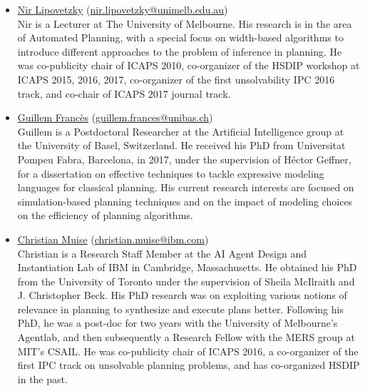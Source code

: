\documentclass[10pt]{article}
\begin{document}
\begin{itemize}
\item \href{http://people.eng.unimelb.edu.au/nlipovetzky/}{Nir Lipovetzky}
  (\href{mailto:nir.lipovetzky@unimelb.edu.au}{nir.lipovetzky@unimelb.edu.au})\\
Nir is a Lecturer at The University of Melbourne. 
His research is in the area of Automated Planning, with a special focus on width-based algorithms
to introduce different approaches to the problem of inference in planning. He was co-publicity chair of ICAPS 2010, co-organizer
of the HSDIP workshop at ICAPS 2015, 2016, 2017, co-organizer of the first unsolvability IPC 2016 track, and co-chair of ICAPS 2017 journal track.

\item \href{http://ai.cs.unibas.ch/people/}{Guillem Franc\`{e}s}
     (\href{mailto:guillem.frances@unibas.ch}{guillem.frances@unibas.ch})\\
Guillem is a Postdoctoral Researcher at the Artificial Intelligence group at the University of Basel, Switzerland.
He received his PhD from Universitat Pompeu Fabra, Barcelona, in 2017, under the supervision of H\'{e}ctor Geffner,
for a dissertation on effective techniques to tackle expressive modeling languages for classical planning.
His current research interests are focused on simulation-based planning techniques and on 
the impact of modeling choices on the efficiency of planning algorithms.



\item \href{http://www.haz.ca/}{Christian Muise}
 (\href{mailto:christian.muise@ibm.com}{christian.muise@ibm.com})\\
Christian is a Research Staff Member at the AI Agent Design and Instantiation Lab of IBM
in Cambridge, Massachusetts. He obtained his PhD from the University of Toronto under the
supervision of Sheila McIlraith and J. Christopher Beck. His PhD research was on exploiting
various notions of relevance in planning to synthesize and execute plans better. Following
his PhD, he was a post-doc for two years with the University of Melbourne's Agentlab, and
then subsequently a Research Fellow with the MERS group at MIT's CSAIL. He was co-publicity
chair of ICAPS 2016, a co-organizer of the first IPC track on unsolvable planning problems,
and has co-organized HSDIP in the past.



\end{itemize}
\end{document}
